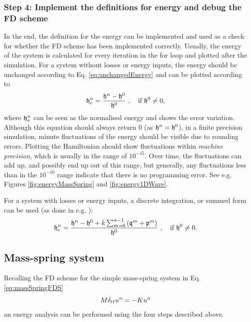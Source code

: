 {{{{%

\subsubsection{Step 4: Implement the definitions for energy and debug the FD scheme}
In the end, the definition for the energy can be implemented and used as a check for whether the FD scheme has been implemented correctly. Usually, the energy of the system is calculated for every iteration in the for loop and plotted after the simulation.
For a system without losses or energy inputs, the energy should be unchanged according to Eq. \eqref{eq:unchangedEnergy} and can be plotted according to
% 
\begin{equation}\label{eq:normalisedEnergy}
    \mathfrak{h}_{\text{e}}^n = \frac{\mathfrak{h}^n - \mathfrak{h}^0}{\mathfrak{h}^0}\ ,\quad \text{if}\  \mathfrak{h}^0\neq 0,
\end{equation}
% 
where $\mathfrak{h}^n_\text{e}$ can be seen as the normalised energy and shows the error variation. 
Although this equation should always return $0$ (as $\mathfrak{h}^n = \mathfrak{h}^0$), in a finite precision simulation, minute fluctuations of the energy should be visible due to rounding errors. Plotting the Hamiltonian should show fluctuations within \textit{machine precision}, which is usually in the range of $10^{-15}$. Over time, the fluctuations can add up, and possibly end up out of this range, but generally, any fluctuations less than in the $10^{-10}$ range indicate that there is no programming error. See e.g. Figures \ref{fig:energyMassSpring} and \ref{fig:energy1DWave}.

For a system with losses or energy inputs, a discrete integration, or summed form can be used (as done in e.g. \cite{Harrison2018}):
\begin{equation}\label{eq:normalisedEnergyDamping}
    \h_{\text{e}}^n = \frac{\h^n-\h^0 + k\sum_{m = 0}^{n-1} \left(\mathfrak{q}^m + \mathfrak{p}^m\right)}{\h^0}\ ,\quad \text{if}\ \h^0\neq 0.
\end{equation}

\subsection{Mass-spring system}
Recalling the FD scheme for the simple mass-spring system in Eq. \eqref{eq:massSpringFDS}
\begin{equation*}
    M\delta_{tt} u^n = -Ku^n
\end{equation*}
an energy analysis can be performed using the four steps described above. 

}}}}
